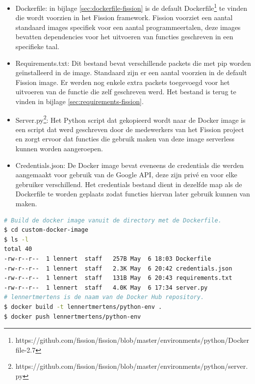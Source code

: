 \begin{itemize}
    \item Dockerfile: in bijlage \ref{sec:dockerfile-fission} is de default Dockerfile\footnote{https://github.com/fission/fission/blob/master/environments/python/Dockerfile-2.7} te vinden die wordt voorzien in het Fission framework. Fission voorziet een aantal standaard images specifiek voor een aantal programmeertalen, deze images bevatten dependencies voor het uitvoeren van functies geschreven in een specifieke taal.
    \item Requirements.txt: Dit bestand bevat verschillende packets die met pip worden geïnstalleerd in de image. Standaard zijn er een aantal voorzien in de default Fission image. Er werden nog enkele extra packets toegevoegd voor het uitvoeren van de functie die zelf geschreven werd. Het bestand is terug te vinden in bijlage \ref{sec:requirements-fission}.
    \item Server.py\footnote{https://github.com/fission/fission/blob/master/environments/python/server.py}: Het Python script dat gekopieerd wordt naar de Docker image is een script dat werd geschreven door de medewerkers van het Fission project en zorgt ervoor dat functies die gebruik maken van deze image serverless kunnen worden aangeroepen. 
    \item Credentials.json: De Docker image bevat eveneens de credentials die werden aangemaakt voor gebruik van de Google API, deze zijn privé en voor elke gebruiker verschillend. Het credentials bestand dient in dezelfde map als de Dockerfile te worden geplaats zodat functies hiervan later gebruik kunnen van maken. 
\end{itemize}

\begin{lstlisting}[language=bash]
# Build de docker image vanuit de directory met de Dockerfile.
$ cd custom-docker-image
$ ls -l
total 40
-rw-r--r--  1 lennert  staff   257B May  6 18:03 Dockerfile
-rw-r--r--  1 lennert  staff   2.3K May  6 20:42 credentials.json
-rw-r--r--  1 lennert  staff   131B May  6 20:43 requirements.txt
-rw-r--r--  1 lennert  staff   4.0K May  6 17:34 server.py
# lennertmertens is de naam van de Docker Hub repository.
$ docker build -t lennertmertens/python-env . 
$ docker push lennertmertens/python-env
\end{lstlisting}

